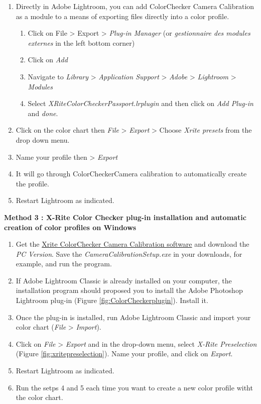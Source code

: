 \documentclass[
]{book}
\begin{document}
\begin{enumerate}
\def\labelenumi{\arabic{enumi}.}
\item
  Directly in Adobe Lightroom, you can add ColorChecker Camera
  Calibration as a module to a means of exporting files directly into
  a color profile.

  \begin{enumerate}
  \def\labelenumii{\arabic{enumii}.}
  \item
    Click on File \textgreater{} Export \textgreater{} \emph{Plug-in Manager} (or \emph{gestionnaire
    des modules externes} in the left bottom corner)
  \item
    Click on \emph{Add}
  \item
    Navigate to \emph{Library} \textgreater{} \emph{Application Support} \textgreater{} \emph{Adobe} \textgreater{}
    \emph{Lightroom} \textgreater{} \emph{Modules}
  \item
    Select \emph{XRiteColorCheckerPassport.lrplugin} and then click on
    \emph{Add Plug-in} and \emph{done}.
  \end{enumerate}
\item
  Click on the color chart then \emph{File} \textgreater{} \emph{Export} \textgreater{} Choose \emph{Xrite
  presets} from the drop down menu.
\item
  Name your profile then \textgreater{} \emph{Export}
\item
  It will go through ColorCheckerCamera calibration to automatically
  create the profile.
\item
  Restart Lightroom as indicated.
\end{enumerate}

\textbf{Method 3 : X-Rite Color Checker plug-in installation and automatic
creation of color profiles on Windows}

\begin{enumerate}
\def\labelenumi{\arabic{enumi}.}
\item
  Get the \href{https://xritephoto.com/ph_product_overview.aspx?ID=938\&Action=Support\&SoftwareID=2030}{Xrite ColorChecker Camera Calibration
  software}
  and download the \emph{PC Version}. Save the \emph{CameraCalibrationSetup.exe}
  in your downloads, for example, and run the program.
\item
  If Adobe Lightroom Classic is already installed on your computer,
  the installation program should proposed you to install the Adobe
  Photoshop Lightroom plug-in (Figure \ref{fig:ColorCheckerplugin}). Install it.
\item
  Once the plug-in is installed, run Adobe Lightroom Classic and
  import your color chart (\emph{File} \textgreater{} \emph{Import}).
\item
  Click on \emph{File} \textgreater{} \emph{Export} and in the drop-down menu, select
  \emph{X-Rite Preselection} (Figure \ref{fig:xritepreselection}). Name your profile, and click on
  \emph{Export}.
\item
  Restart Lightroom as indicated.
\item
  Run the setps 4 and 5 each time you want to create a new color
  profile witht the color chart.
\end{enumerate}
\end{document}
